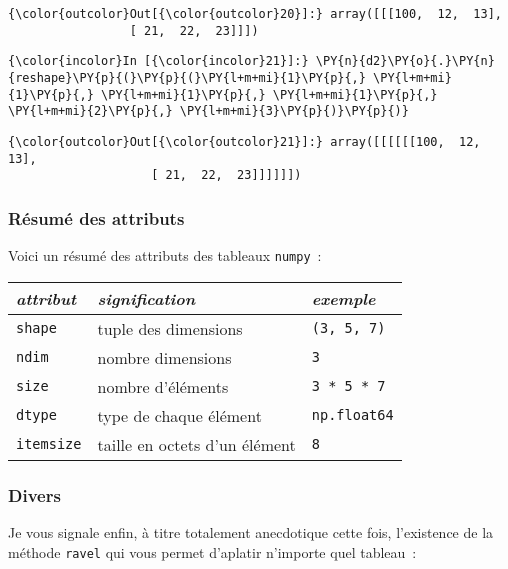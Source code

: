 \begin{Verbatim}[commandchars=\\\{\}]
{\color{outcolor}Out[{\color{outcolor}20}]:} array([[[100,  12,  13],
                 [ 21,  22,  23]]])
\end{Verbatim}
            
    \begin{Verbatim}[commandchars=\\\{\}]
{\color{incolor}In [{\color{incolor}21}]:} \PY{n}{d2}\PY{o}{.}\PY{n}{reshape}\PY{p}{(}\PY{p}{(}\PY{l+m+mi}{1}\PY{p}{,} \PY{l+m+mi}{1}\PY{p}{,} \PY{l+m+mi}{1}\PY{p}{,} \PY{l+m+mi}{1}\PY{p}{,} \PY{l+m+mi}{2}\PY{p}{,} \PY{l+m+mi}{3}\PY{p}{)}\PY{p}{)}
\end{Verbatim}


\begin{Verbatim}[commandchars=\\\{\}]
{\color{outcolor}Out[{\color{outcolor}21}]:} array([[[[[[100,  12,  13],
                    [ 21,  22,  23]]]]]])
\end{Verbatim}
            
    \hypertarget{ruxe9sumuxe9-des-attributs}{%
\subsubsection{Résumé des attributs}\label{ruxe9sumuxe9-des-attributs}}

    Voici un résumé des attributs des tableaux \texttt{numpy}~:

    \begin{longtable}[]{@{}lll@{}}
\toprule
\emph{attribut} & \emph{signification} & \emph{exemple}\tabularnewline
\midrule
\endhead
\texttt{shape} & tuple des dimensions &
\texttt{(3,\ 5,\ 7)}\tabularnewline
\texttt{ndim} & nombre dimensions & \texttt{3}\tabularnewline
\texttt{size} & nombre d'éléments &
\texttt{3\ *\ 5\ *\ 7}\tabularnewline
\texttt{dtype} & type de chaque élément &
\texttt{np.float64}\tabularnewline
\texttt{itemsize} & taille en octets d'un élément &
\texttt{8}\tabularnewline
\bottomrule
\end{longtable}

    \hypertarget{divers}{%
\subsubsection{Divers}\label{divers}}

    Je vous signale enfin, à titre totalement anecdotique cette fois,
l'existence de la méthode \texttt{ravel} qui vous permet d'aplatir
n'importe quel tableau~:

